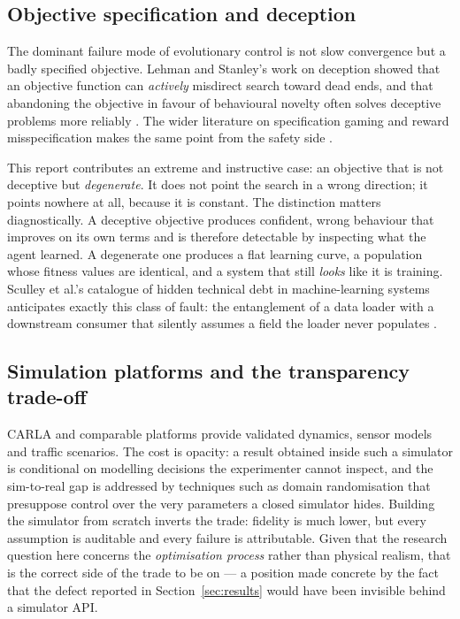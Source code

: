 \documentclass[conference]{IEEEtran}
\begin{document}
\subsection{Objective specification and deception}

The dominant failure mode of evolutionary control is not slow convergence but a badly specified objective. Lehman and Stanley's work on deception showed that an objective function can \emph{actively} misdirect search toward dead ends, and that abandoning the objective in favour of behavioural novelty often solves deceptive problems more reliably \cite{novelty}. The wider literature on specification gaming and reward misspecification makes the same point from the safety side \cite{amodei}.

This report contributes an extreme and instructive case: an objective that is not deceptive but \emph{degenerate}. It does not point the search in a wrong direction; it points nowhere at all, because it is constant. The distinction matters diagnostically. A deceptive objective produces confident, wrong behaviour that improves on its own terms and is therefore detectable by inspecting what the agent learned. A degenerate one produces a flat learning curve, a population whose fitness values are identical, and a system that still \emph{looks} like it is training. Sculley et al.'s catalogue of hidden technical debt in machine-learning systems anticipates exactly this class of fault: the entanglement of a data loader with a downstream consumer that silently assumes a field the loader never populates \cite{sculley}.

\subsection{Simulation platforms and the transparency trade-off}

CARLA \cite{carla} and comparable platforms provide validated dynamics, sensor models and traffic scenarios. The cost is opacity: a result obtained inside such a simulator is conditional on modelling decisions the experimenter cannot inspect, and the sim-to-real gap is addressed by techniques such as domain randomisation \cite{tobin} that presuppose control over the very parameters a closed simulator hides. Building the simulator from scratch inverts the trade: fidelity is much lower, but every assumption is auditable and every failure is attributable. Given that the research question here concerns the \emph{optimisation process} rather than physical realism, that is the correct side of the trade to be on — a position made concrete by the fact that the defect reported in Section~\ref{sec:results} would have been invisible behind a simulator API.
\end{document}
